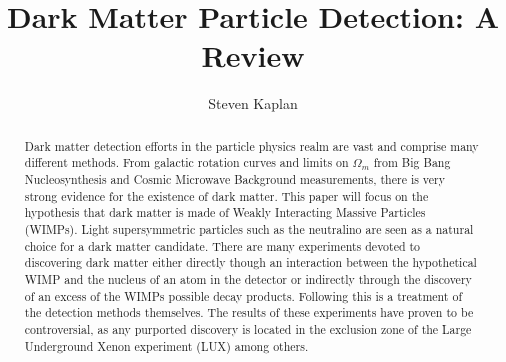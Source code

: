 \documentclass[aps,reprint,prl]{revtex4-1}
\begin{document}
\title{Dark Matter Particle Detection: A Review}
\author{Steven Kaplan}

\begin{abstract}
Dark matter detection efforts in the particle physics realm are vast and comprise many different methods.  From galactic rotation curves and limits on $\Omega_m$ from Big Bang Nucleosynthesis and Cosmic Microwave Background measurements, there is very strong evidence for the existence of dark matter.  This paper will focus on the hypothesis that dark matter is made of Weakly Interacting Massive Particles (WIMPs).  Light supersymmetric particles such as the neutralino are seen as a natural choice for a dark matter candidate. There are many experiments devoted to discovering dark matter either directly though an interaction between the hypothetical WIMP and the nucleus of an atom in the detector or indirectly through the discovery of an excess of the WIMPs possible decay products.  Following this is a treatment of the detection methods themselves.  The results of these experiments have proven to be controversial, as any purported discovery is located in the exclusion zone of the Large Underground Xenon experiment (LUX) among others.
\end{abstract}

\maketitle
\end{document}
